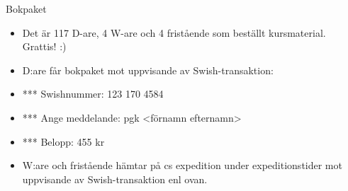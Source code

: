 \documentclass{lecturesimple}
\begin{document}



\begin{Slide}{Bokpaket}
  \begin{itemize}
    \item Det är 117 D-are, 4 W-are och 4 fristående som beställt kursmaterial. Grattis! :)
    \item D:are får bokpaket mot uppvisande av Swish-transaktion:
    \item[] *** Swishnummer: 123 170 4584
    \item[] *** Ange meddelande: pgk <förnamn efternamn>
    \item[] *** Belopp: 455 kr 
    \item W:are och fristående hämtar på cs expedition under expeditionstider mot uppvisande av Swish-transaktion enl ovan.
  \end{itemize}
  
\end{Slide}
\end{document}
